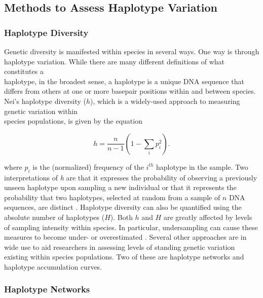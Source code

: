 \subsection{Methods to Assess Haplotype Variation}

\subsubsection{Haplotype Diversity}

Genetic diversity is manifested within species in several ways. One way is through haplotype variation. While there are many different definitions of what constitutes a \\ haplotype, in the broadest sense, a haplotype is a unique DNA sequence that differs from others at one or more basepair positions within and between species. Nei's \cite{nei1987molecular} haplotype diversity ($h$), which is a widely-used approach to measuring genetic variation within \\ species populations, is given by the equation 

\begin{equation}
h = \frac{n}{n-1}\left(1 - \sum_i{p_i^2}\right).
\end{equation}



\noindent where $p_i$ is the (normalized) frequency of the $i^{th}$ haplotype in the sample. Two \\ interpretations of \textit{h} are that it expresses the probability of observing a previously unseen haplotype upon sampling a new individual \cite{wares2015can} or that it represents the probability that two haplotypes, selected at random from a sample of $n$ DNA sequences, are distinct \cite{goodall2012comparison}. Haplotype diversity can also be quantified using the absolute number of haplotypes ($H$). Both $h$ and $H$ are greatly affected by levels of sampling intensity within species. In particular, undersampling can cause these measures to become under- or overestimated \cite{goodall2012comparison}. Several other approaches are in wide use to aid researchers in assessing levels of standing genetic variation existing within species populations. Two of these are haplotype networks and haplotype accumulation curves. 



\subsubsection{Haplotype Networks} 

